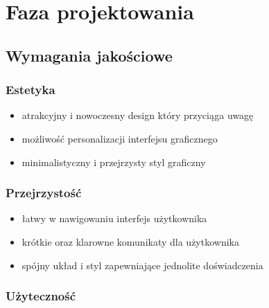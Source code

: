 \newcommand{\tabeladwiekolumnywiersz}[2]{
    \parbox[c][1em][c]{\textwidth}{
        #1
    } &
    \parbox[c][2.5em][c]{\textwidth}{
        #2
    }
    \\
    \hline
}

\newcommand{\tabeladwiekolumny}[3]{
    \begin{center}
        \begin{tabularx}{1\textwidth} {
                | >{\hsize=#1\hsize}X
                | >{\hsize=#2\hsize}X |}
            \hline

            #3
        \end{tabularx}
    \end{center}
}

\section{Faza projektowania}

\subsection{Wymagania jakościowe}

\subsubsection{Estetyka}

\begin{itemize}[leftmargin=*]
    \item atrakcyjny i nowoczesny design który przyciąga uwagę
    \item możliwość personalizacji interfejsu graficznego
    \item minimalistyczny i przejrzysty styl graficzny
\end{itemize}

\subsubsection{Przejrzystość}

\begin{itemize}[leftmargin=*]
    \item łatwy w nawigowaniu interfejs użytkownika
    \item krótkie oraz klarowne komunikaty dla użytkownika
    \item spójny układ i styl zapewniające jednolite doświadczenia
\end{itemize}

\subsubsection{Użyteczność}

